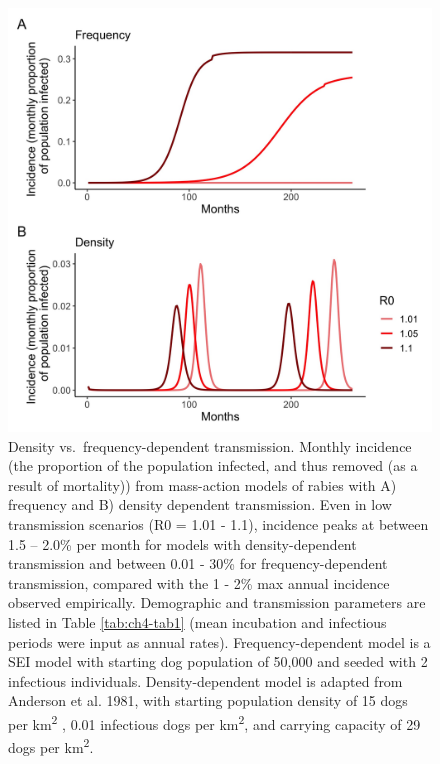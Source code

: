 \documentclass[
  oneside]{book}
\newcommand{\beginsupplement}{
  \setcounter{table}{0}  
  \renewcommand{\thetable}{S\arabic{chapter}.\arabic{table}} 
  \setcounter{figure}{0} 
  \renewcommand{\thefigure}{S\arabic{chapter}.\arabic{figure}}
}
\begin{document}
\beginsupplement

\begin{figure}
\includegraphics[width=0.8\linewidth]{figs/ch3/image4} \caption[Density vs. frequency-dependent transmission.]{Density vs.~frequency-dependent transmission.
Monthly incidence (the proportion of the population
infected, and thus removed (as a result of mortality)) from mass-action
models of rabies with A) frequency and B) density dependent
transmission. Even in low transmission scenarios (R0 = 1.01 - 1.1),
incidence peaks at between 1.5 -- 2.0\% per month for models with
density-dependent transmission and between 0.01 - 30\% for
frequency-dependent transmission, compared with the 1 - 2\% max annual
incidence observed empirically. Demographic and transmission parameters
are listed in Table \ref{tab:ch4-tab1} (mean incubation and infectious periods were
input as annual rates). Frequency-dependent model is a SEI model with
starting dog population of 50,000 and seeded with 2 infectious
individuals. Density-dependent model is adapted from Anderson et al.
1981, with starting population density of 15 dogs per km\textsuperscript{2} , 0.01
infectious dogs per km\textsuperscript{2}, and carrying capacity of 29 dogs per km\textsuperscript{2}.}\label{fig:figS1}
\end{figure}
\end{document}
